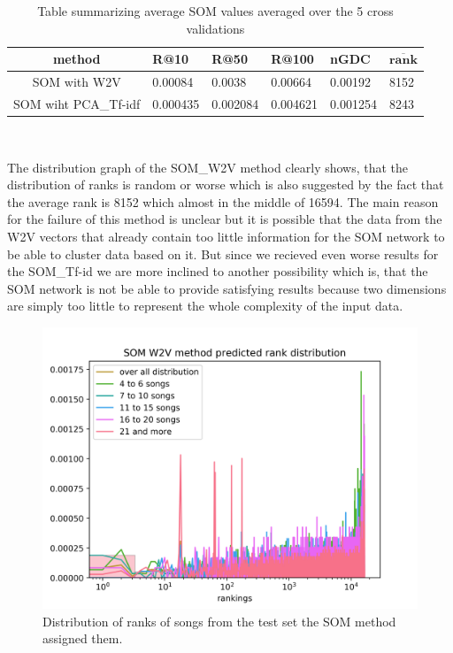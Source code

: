 \begin{table}[h!]
\centering
\renewcommand{\arraystretch}{1.5}
\begin{tabu} to 1\textwidth { | c || X[c] | X[c] | X[c] | X[c] | X[c] |}
 \hline
 \textbf{method} & \textbf{R@10} & \textbf{R@50} & \textbf{R@100} & \textbf{nGDC} & $ \boldsymbol{\overline{rank}} $ \\
 \hline
 \hline
 SOM with W2V & 0.00084 & 0.0038 & 0.00664 & 0.00192 & 8152 \\
 \hline
 SOM wiht PCA_Tf-idf & 0.000435 & 0.002084 & 0.004621 & 0.001254 & 8243 \\
 \hline
\end{tabu} \\
\caption{Table summarizing average SOM values averaged over the 5 cross validations}
\label{table:som}
\end{table}
The distribution graph of the SOM\_W2V method clearly shows, that the distribution of ranks is random or worse which is also suggested by the fact that the average rank is 8152 which almost in the middle of 16594. The main reason for the failure of this method is unclear but it is possible that the data from the W2V vectors that already contain too little information for the SOM network to be able to cluster data based on it.  But since we recieved even worse results for the SOM\_Tf-id we are more inclined to another possibility which is, that the SOM network is not be able to provide satisfying results because two dimensions are simply too little to represent the whole complexity of the input data.
\begin{figure}[h]
    \centering
	\includegraphics[width=120mm]{./img/som_w2v_graph.png}
	\caption{Distribution of ranks of songs from the test set the SOM method assigned them.}
	\label{fig:som_distribution}
\end{figure}
